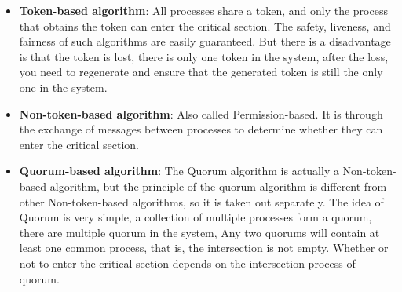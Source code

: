 \documentclass[12pt, a4paper]{article}
\begin{document}
\begin{itemize}
  \item \textbf{Token-based algorithm}: All processes share a token, and only the 
  process that obtains the token can enter the critical section. The safety, 
  liveness, and fairness of such algorithms are easily guaranteed. But there is 
  a disadvantage is that the token is lost, there is only one token in the 
  system, after the loss, you need to regenerate and ensure that the generated 
  token is still the only one in the system. 
  \item \textbf{Non-token-based algorithm}: Also called Permission-based. It is 
  through the exchange of messages between processes to determine whether they 
  can enter the critical section. 
  \item \textbf{Quorum-based algorithm}: The Quorum algorithm is actually a 
  Non-token-based algorithm, but the principle of the quorum algorithm is 
  different from other Non-token-based algorithms, so it is taken out 
  separately. The idea of Quorum is very simple, a collection of multiple 
  processes form a quorum, there are multiple quorum in the system, Any two 
  quorums will contain at least one common process, that is, the intersection 
  is not empty. Whether or not to enter the critical section depends on the 
  intersection process of quorum. 
\end{itemize}
\end{document}
